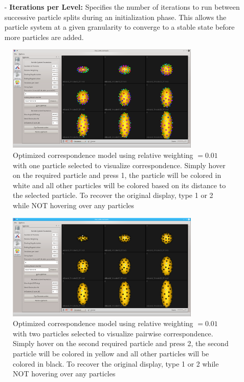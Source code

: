 \documentclass[letterpaper,12pt]{article}   %
\begin{document}
\begin{itemize}
\item[-] \textbf{Iterations per Level:} Specifies the number of iterations to run between successive particle splits during an initialization phase. This allows the particle system at a given granularity to converge to a stable state before more particles are added.

\end{itemize}

\begin{figure}[!htp]
	\centering
	\includegraphics[width=0.82\textwidth]{figs_v2/ellipsoid_w001_corr_qc_1.png}
	\caption{Optimized correspondence model using relative weighting $ = 0.01$ with one particle selected to visualize correspondence. Simply hover on the required particle and press 1, the particle will be colored in white and all other particles will be colored based on its distance to the selected particle. To recover the original display, type 1 or 2 while NOT hovering over any particles}
	\label{fig:rel_low_hover1}
\end{figure}

\begin{figure}[!htp]
	\centering
	\includegraphics[width=0.82\textwidth]{figs_v2/ellipsoid_w001_corr_qc_2.png}
	\caption{Optimized correspondence model using relative weighting $ = 0.01$ with two particles selected to visualize pairwise correspondence. Simply hover on the second required particle and press 2, the second particle will be colored in yellow and all other particles will be colored in black. To recover the original display, type 1 or 2 while NOT hovering over any particles}
	\label{fig:rel_low_hover2}
\end{figure}
\end{document}
